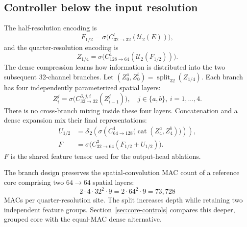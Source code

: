 \documentclass[10pt,twocolumn,letterpaper]{article}
\newcommand{\U}{\mathcal{U}}
\newcommand{\PS}{\mathcal{S}}
\newcommand{\Cat}{\operatorname{cat}}
\begin{document}
\subsection{Controller below the input resolution}
The half-resolution encoding is
\begin{equation}
 F_{1/2}=\sigma\big(C^1_{32\rightarrow32}(\U_2(E))\big),
 \label{eq:enc}
\end{equation}
and the quarter-resolution encoding is
\begin{equation}
 Z_{1/4}=\sigma\big(C^1_{128\rightarrow64}(\U_2(F_{1/2}))\big).
 \label{eq:compress}
\end{equation}
The dense compression learns how information is distributed into the two subsequent 32-channel branches.
Let $(Z^a_0,Z^b_0)=\operatorname{split}_{32}(Z_{1/4})$.
Each branch has four independently parameterized spatial layers:
\begin{equation}
 Z^j_i=\sigma\big(C^{3,j,i}_{32\rightarrow32}(Z^j_{i-1})\big),
 \quad j\in\{a,b\},\ i=1,\ldots,4.
 \label{eq:branches}
\end{equation}
There is no cross-branch mixing inside these four layers.
Concatenation and a dense expansion mix their final representations:
\begin{align}
 U_{1/2}&=\PS_2\left(\sigma\left(C^1_{64\rightarrow128}
             \big(\Cat(Z^a_4,Z^b_4)\big)\right)\right),\label{eq:expand}\\
 F&=\sigma\big(C^3_{32\rightarrow64}(F_{1/2}+U_{1/2})\big).
 \label{eq:refine}
\end{align}
$F$ is the shared feature tensor used for the output-head ablations.

The branch design preserves the spatial-convolution MAC count of a reference core comprising two $64\rightarrow64$ spatial layers:
\begin{equation}
 2\cdot4\cdot32^2\cdot9
 =2\cdot64^2\cdot9
 =73{,}728
 \label{eq:branchmac}
\end{equation}
MACs per quarter-resolution site.
The split increases depth while retaining two independent feature groups.
Section~\ref{sec:core-controls} compares this deeper, grouped core with the equal-MAC dense alternative.
\end{document}
